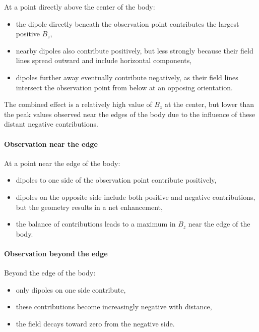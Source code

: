 At a point directly above the center of the body:

\begin{itemize}
    \item the dipole directly beneath the observation point contributes the largest positive $B_z$,
    \item nearby dipoles also contribute positively, but less strongly because their field lines spread outward and include horizontal components,
    \item dipoles further away eventually contribute negatively, as their field lines intersect the observation point from below at an opposing orientation.
\end{itemize}

The combined effect is a relatively high value of $B_z$ at the center, but lower than the peak values observed near the edges of the body due to the influence of these distant negative contributions.

\paragraph{Observation near the edge}

At a point near the edge of the body:

\begin{itemize}
    \item dipoles to one side of the observation point contribute positively,
    \item dipoles on the opposite side include both positive and negative contributions, but the geometry results in a net enhancement,
    \item the balance of contributions leads to a maximum in $B_z$ near the edge of the body.
\end{itemize}

\paragraph{Observation beyond the edge}

Beyond the edge of the body:

\begin{itemize}
    \item only dipoles on one side contribute,
    \item these contributions become increasingly negative with distance,
    \item the field decays toward zero from the negative side.
\end{itemize}

